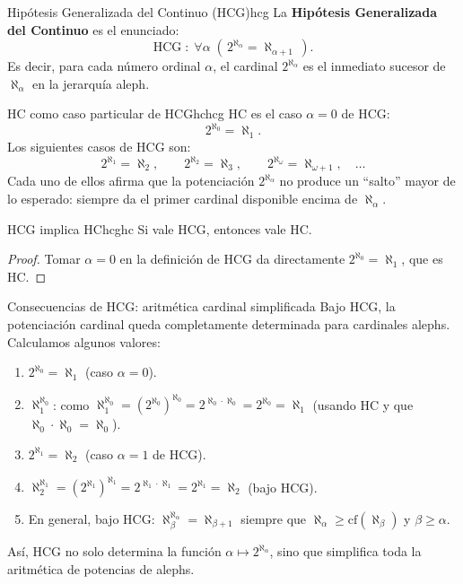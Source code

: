\begin{definicion}{Hipótesis Generalizada del Continuo (HCG)}{hcg}
La \textbf{Hipótesis Generalizada del Continuo} es el enunciado:
\[
  \mathrm{HCG} \;:\; \forall \alpha \;(\, 2^{\aleph_\alpha} = \aleph_{\alpha+1} \,).
\]
Es decir, para cada número ordinal $\alpha$, el cardinal $2^{\aleph_\alpha}$ es el inmediato sucesor de $\aleph_\alpha$ en la jerarquía aleph.
\end{definicion}

\begin{observacion}{HC como caso particular de HCG}{hchcg}
HC es el caso $\alpha = 0$ de HCG:
\[
  2^{\aleph_0} = \aleph_1.
\]
Los siguientes casos de HCG son:
\[
  2^{\aleph_1} = \aleph_2, \qquad 2^{\aleph_2} = \aleph_3, \qquad 2^{\aleph_\omega} = \aleph_{\omega+1}, \quad \ldots
\]
Cada uno de ellos afirma que la potenciación $2^{\aleph_\alpha}$ no produce un ``salto'' mayor de lo esperado: siempre da el primer cardinal disponible encima de $\aleph_\alpha$.
\end{observacion}

\begin{teorema}{HCG implica HC}{hcghc}
Si vale HCG, entonces vale HC.
\end{teorema}

\begin{proof}
Tomar $\alpha = 0$ en la definición de HCG da directamente $2^{\aleph_0} = \aleph_1$, que es HC.
\end{proof}

\begin{ejemplo}{Consecuencias de HCG: aritmética cardinal simplificada}{}
Bajo HCG, la potenciación cardinal queda completamente determinada para cardinales alephs. Calculamos algunos valores:
\begin{enumerate}[leftmargin=2em, label=(\alph*)]
  \item $2^{\aleph_0} = \aleph_1$ (caso $\alpha = 0$).
  \item $\aleph_1^{\aleph_0}$: como $\aleph_1^{\aleph_0} = (2^{\aleph_0})^{\aleph_0} = 2^{\aleph_0 \cdot \aleph_0} = 2^{\aleph_0} = \aleph_1$ (usando HC y que $\aleph_0 \cdot \aleph_0 = \aleph_0$).
  \item $2^{\aleph_1} = \aleph_2$ (caso $\alpha = 1$ de HCG).
  \item $\aleph_2^{\aleph_1} = (2^{\aleph_1})^{\aleph_1} = 2^{\aleph_1 \cdot \aleph_1} = 2^{\aleph_1} = \aleph_2$ (bajo HCG).
  \item En general, bajo HCG: $\aleph_\beta^{\aleph_\alpha} = \aleph_{\beta+1}$ siempre que $\aleph_\alpha \geq \mathrm{cf}(\aleph_\beta)$ y $\beta \geq \alpha$.
\end{enumerate}
Así, HCG no solo determina la función $\alpha \mapsto 2^{\aleph_\alpha}$, sino que simplifica toda la aritmética de potencias de alephs.
\end{ejemplo}

